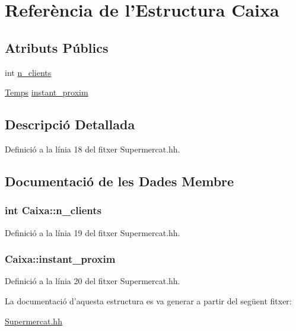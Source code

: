 \hypertarget{struct_caixa}{\section{Referència de l'Estructura Caixa}
\label{struct_caixa}
}
\subsection*{Atributs Públics}
\begin{DoxyCompactItemize}
\item 
int \hyperlink{struct_caixa_af62e7e1b599b3e57cb0f2f961335f914}{n\-\_\-clients}
\item 
\hyperlink{class_temps}{Temps} \hyperlink{struct_caixa_a1bdc14d5913064368efb726816d76d0c}{instant\-\_\-proxim}
\end{DoxyCompactItemize}


\subsection{Descripció Detallada}


Definició a la línia 18 del fitxer Supermercat.\-hh.



\subsection{Documentació de les Dades Membre}
\hypertarget{struct_caixa_af62e7e1b599b3e57cb0f2f961335f914}{
\subsubsection[{n\-\_\-clients}]{\setlength{\rightskip}{0pt plus 5cm}int Caixa\-::n\-\_\-clients}}\label{struct_caixa_af62e7e1b599b3e57cb0f2f961335f914}


Definició a la línia 19 del fitxer Supermercat.\-hh.

\hypertarget{struct_caixa_a1bdc14d5913064368efb726816d76d0c}{
\subsubsection[{instant\-\_\-proxim}]{ Caixa\-::instant\-\_\-proxim}}\label{struct_caixa_a1bdc14d5913064368efb726816d76d0c}


Definició a la línia 20 del fitxer Supermercat.\-hh.



La documentació d'aquesta estructura es va generar a partir del següent fitxer\-:\begin{DoxyCompactItemize}
\item 
\hyperlink{_supermercat_8hh}{Supermercat.\-hh}\end{DoxyCompactItemize}
